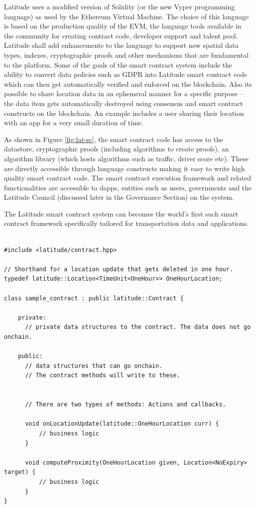 Latitude uses a
modified version of Solidity (or the new Vyper programming language) as used by the Ethereum Virtual Machine. The choice
of this language is based on the production quality of the EVM, the language tools available in the community for
creating contract code, developer support and talent pool. Latitude shall add enhancements to the language to support
new spatial data types, indexes, cryptographic proofs and other mechanisms that are fundamental to the platform. Some of
the goals of the smart contract system include the ability to convert data policies such as GDPR \cite{gdpr} into
Latitude smart contract code which can then get automatically verified and enforced on the blockchain.  Also its
possible to share location data in an ephemeral manner for a specific purpose -- the data item gets automatically
destroyed using consensus and smart contract constructs on the blockchain. An example includes a user sharing their
location with an app for a very small duration of time.

As shown in Figure \ref{fig:lat-sc}, the smart contract code has access to the datastore, cryptographic proofs
(including algorithms to create proofs), an algorithm library (which hosts algorithms such as traffic, driver score
etc). These are directly accessible through language constructs making it easy to write high quality smart contract
code. The smart contract execution framework and related functionalities are accessible to dapps, entities such as
users, governments and the Latitude Council (discussed later in the Governance Section) on the system. 

The Latitude smart contract system can becomes the world's first such smart contract framework specifically tailored for
transportation data and applications.

\lstset{language=C++,basicstyle=\small}

\begin{lstlisting}[float, caption=Structure of a Latitude Smart Contract, frame=lines]

#include <latitude/contract.hpp>

// Shorthand for a location update that gets deleted in one hour.
typedef latitude::Location<TimeUnit<OneHour>> OneHourLocation;

class sample_contract : public latitude::Contract {

    private:
      // private data structures to the contract. The data does not go onchain.

    public:
      // data structures that can go onchain.
      // The contract methods will write to these.


      // There are two types of methods: Actions and callbacks.

      void onLocationUpdate(latitude::OneHourLocation curr) {
          // business logic
      }

      void computeProximity(OneHourLocation given, Location<NoExpiry> target) {
          // business logic
      }
}
\end{lstlisting}

